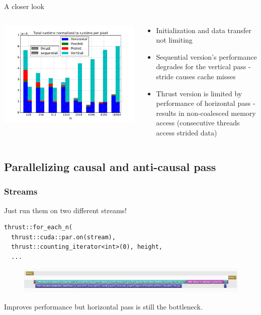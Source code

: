 \documentclass{beamer}
\begin{document}
\begin{frame}{A closer look}
  \begin{columns}
    \begin{column}{7cm}
      \includegraphics[scale=0.4]{imgs/thrust_vs_sequential_normalized.pdf} 
    \end{column}
    \begin{column}{5cm}
      \begin{itemize}
        \item Initialization and data transfer not limiting
        \item Sequential version's performance degrades for the vertical
          pass - stride causes cache misses
        \item Thrust version is limited by performance of horizontal pass -
          results in non-coalesced memory access (consecutive threads access
          strided data)
      \end{itemize}
    \end{column}
  \end{columns}
\end{frame} 

\subsection{Parallelizing causal and anti-causal pass}
\begin{frame}[fragile]
\frametitle{Streams}
Just run them on two different streams!
  \begin{lstlisting}[basicstyle=\tiny]
thrust::for_each_n(
  thrust::cuda::par.on(stream),
  thrust::counting_iterator<int>(0), height,
  ...
  \end{lstlisting}
  \begin{figure}
      \includegraphics[scale=0.3]{imgs/overlap.png} 
  \end{figure}
  Improves performance but horizontal pass is still the bottleneck.
\end{frame}
\end{document}
